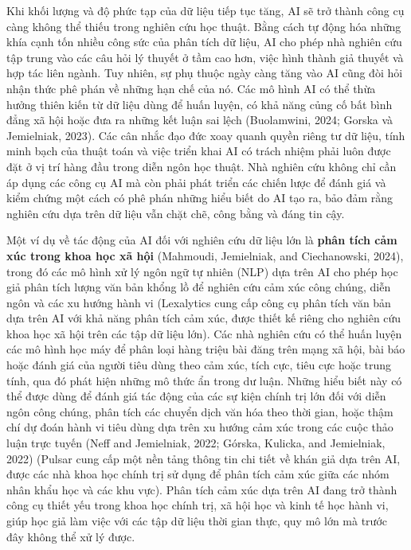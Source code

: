 Khi khối lượng và độ phức tạp của dữ liệu tiếp tục tăng, AI sẽ trở thành công cụ càng không thể thiếu trong nghiên cứu học thuật. Bằng cách tự động hóa những khía cạnh tốn nhiều công sức của phân tích dữ liệu, AI cho phép nhà nghiên cứu tập trung vào các câu hỏi lý thuyết ở tầm cao hơn, việc hình thành giả thuyết và hợp tác liên ngành. Tuy nhiên, sự phụ thuộc ngày càng tăng vào AI cũng đòi hỏi nhận thức phê phán về những hạn chế của nó. Các mô hình AI có thể thừa hưởng thiên kiến từ dữ liệu dùng để huấn luyện, có khả năng củng cố bất bình đẳng xã hội hoặc đưa ra những kết luận sai lệch (Buolamwini, 2024; Gorska và Jemielniak, 2023). Các cân nhắc đạo đức xoay quanh quyền riêng tư dữ liệu, tính minh bạch của thuật toán và việc triển khai AI có trách nhiệm phải luôn được đặt ở vị trí hàng đầu trong diễn ngôn học thuật. Nhà nghiên cứu không chỉ cần áp dụng các công cụ AI mà còn phải phát triển các chiến lược để đánh giá và kiểm chứng một cách có phê phán những hiểu biết do AI tạo ra, bảo đảm rằng nghiên cứu dựa trên dữ liệu vẫn chặt chẽ, công bằng và đáng tin cậy.

Một ví dụ về tác động của AI đối với nghiên cứu dữ liệu lớn là \textbf{phân tích cảm xúc trong khoa học xã hội} (Mahmoudi, Jemielniak, and Ciechanowski, 2024), trong đó các mô hình xử lý ngôn ngữ tự nhiên (NLP) dựa trên AI cho phép học giả phân tích lượng văn bản khổng lồ để nghiên cứu cảm xúc công chúng, diễn ngôn và các xu hướng hành vi (Lexalytics cung cấp công cụ phân tích văn bản dựa trên AI với khả năng phân tích cảm xúc, được thiết kế riêng cho nghiên cứu khoa học xã hội trên các tập dữ liệu lớn). Các nhà nghiên cứu có thể huấn luyện các mô hình học máy để phân loại hàng triệu bài đăng trên mạng xã hội, bài báo hoặc đánh giá của người tiêu dùng theo cảm xúc, tích cực, tiêu cực hoặc trung tính, qua đó phát hiện những mô thức ẩn trong dư luận. Những hiểu biết này có thể được dùng để đánh giá tác động của các sự kiện chính trị lớn đối với diễn ngôn công chúng, phân tích các chuyển dịch văn hóa theo thời gian, hoặc thậm chí dự đoán hành vi tiêu dùng dựa trên xu hướng cảm xúc trong các cuộc thảo luận trực tuyến (Neff and Jemielniak, 2022; Górska, Kulicka, and Jemielniak, 2022) (Pulsar cung cấp một nền tảng thông tin chi tiết về khán giả dựa trên AI, được các nhà khoa học chính trị sử dụng để phân tích cảm xúc giữa các nhóm nhân khẩu học và các khu vực). Phân tích cảm xúc dựa trên AI đang trở thành công cụ thiết yếu trong khoa học chính trị, xã hội học và kinh tế học hành vi, giúp học giả làm việc với các tập dữ liệu thời gian thực, quy mô lớn mà trước đây không thể xử lý được.

